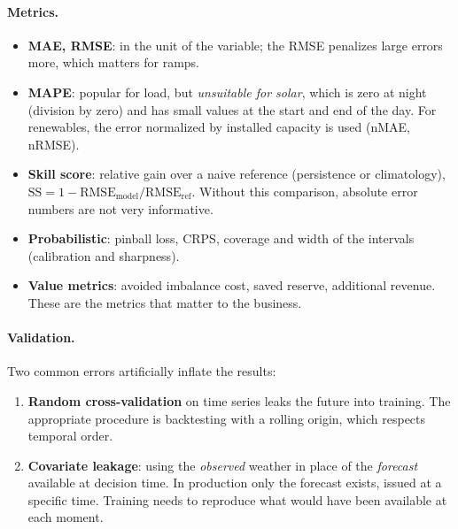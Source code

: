 \documentclass[10pt,a4paper,oneside]{article}
\begin{document}
\paragraph{Metrics.}
\begin{itemize}
  \item \textbf{MAE, RMSE}: in the unit of the variable; the RMSE penalizes
    large errors more, which matters for ramps.
  \item \textbf{MAPE}: popular for load, but \emph{unsuitable for solar},
    which is zero at night (division by zero) and has small values at the
    start and end of the day. For renewables, the error normalized by
    installed capacity is used (nMAE, nRMSE).
  \item \textbf{Skill score}: relative gain over a naive reference
    (persistence or climatology),
    $\mathrm{SS} = 1 - \mathrm{RMSE}_{\text{model}}/\mathrm{RMSE}_{\text{ref}}$.
    Without this comparison, absolute error numbers are not very
    informative.
  \item \textbf{Probabilistic}: pinball loss, CRPS, coverage and width of
    the intervals (calibration and sharpness).
  \item \textbf{Value metrics}: avoided imbalance cost, saved reserve,
    additional revenue. These are the metrics that matter to the business.
\end{itemize}

\paragraph{Validation.} Two common errors artificially inflate the results:
\begin{enumerate}
  \item \textbf{Random cross-validation} on time series leaks the future
    into training. The appropriate procedure is backtesting with a rolling
    origin, which respects temporal order.
  \item \textbf{Covariate leakage}: using the \emph{observed} weather in
    place of the \emph{forecast} available at decision time. In production
    only the forecast exists, issued at a specific time. Training needs to
    reproduce what would have been available at each moment.
\end{enumerate}
\end{document}
